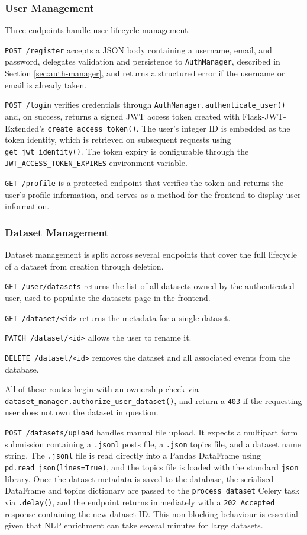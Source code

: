 \documentclass[12pt, a4paper]{article}
\begin{document}
\subsubsection{User Management}
Three endpoints handle user lifecycle management. 

\texttt{POST /register} accepts a JSON body containing a username, email, and password, delegates validation and persistence to \texttt{AuthManager}, described in Section \ref{sec:auth-manager}, and returns a structured error if the username or email is already taken. 

\texttt{POST /login} verifies credentials through \texttt{AuthManager.authenticate\_user()} and, on success, returns a signed JWT access token created with Flask-JWT-Extended's \texttt{create\_access\_token()}. The user's integer ID is embedded as the token identity, which is retrieved on subsequent requests using \texttt{get\_jwt\_identity()}. The token expiry is configurable through the \texttt{JWT\_ACCESS\_TOKEN\_EXPIRES} environment variable. 

\texttt{GET /profile} is a protected endpoint that verifies the token and returns the user's profile information, and serves as a method for the frontend to display user information.

\subsubsection{Dataset Management}
Dataset management is split across several endpoints that cover the full lifecycle of a dataset from creation through deletion.

\texttt{GET /user/datasets} returns the list of all datasets owned by the authenticated user, used to populate the datasets page in the frontend. 

\texttt{GET /dataset/<id>} returns the metadata for a single dataset.

\texttt{PATCH /dataset/<id>} allows the user to rename it. 

\texttt{DELETE /dataset/<id>} removes the dataset and all associated events from the database. 

All of these routes begin with an ownership check via \texttt{dataset\_manager.authorize\_user\_dataset()}, and return a \texttt{403} if the requesting user does not own the dataset in question.

\texttt{POST /datasets/upload} handles manual file upload. It expects a multipart form submission containing a \texttt{.jsonl} posts file, a \texttt{.json} topics file, and a dataset name string. The \texttt{.jsonl} file is read directly into a Pandas DataFrame using \texttt{pd.read\_json(lines=True)}, and the topics file is loaded with the standard \texttt{json} library. Once the dataset metadata is saved to the database, the serialised DataFrame and topics dictionary are passed to the \texttt{process\_dataset} Celery task via \texttt{.delay()}, and the endpoint returns immediately with a \texttt{202 Accepted} response containing the new dataset ID. This non-blocking behaviour is essential given that NLP enrichment can take several minutes for large datasets.
\end{document}
